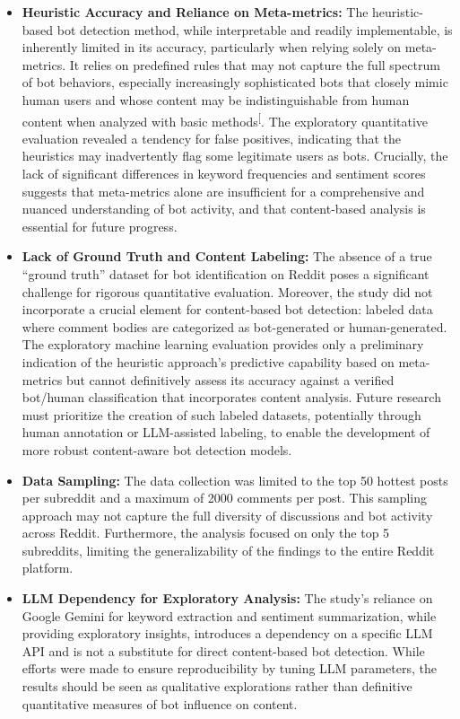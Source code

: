 \documentclass[
  12pt,
  letterpaper,
  DIV=11,
  numbers=noendperiod]{scrartcl}
\begin{document}
\begin{itemize}
\item
  \textbf{Heuristic Accuracy and Reliance on Meta-metrics:} The
  heuristic-based bot detection method, while interpretable and readily
  implementable, is inherently limited in its accuracy, particularly
  when relying solely on meta-metrics. It relies on predefined rules
  that may not capture the full spectrum of bot behaviors, especially
  increasingly sophisticated bots that closely mimic human users and
  whose content may be indistinguishable from human content when
  analyzed with basic
  methods\textsuperscript{{[}\citeproc{ref-botdetectionreddit}{1}{]}}.
  The exploratory quantitative evaluation revealed a tendency for false
  positives, indicating that the heuristics may inadvertently flag some
  legitimate users as bots. Crucially, the lack of significant
  differences in keyword frequencies and sentiment scores suggests that
  meta-metrics alone are insufficient for a comprehensive and nuanced
  understanding of bot activity, and that content-based analysis is
  essential for future progress.
\item
  \textbf{Lack of Ground Truth and Content Labeling:} The absence of a
  true ``ground truth'' dataset for bot identification on Reddit poses a
  significant challenge for rigorous quantitative evaluation. Moreover,
  the study did not incorporate a crucial element for content-based bot
  detection: labeled data where comment bodies are categorized as
  bot-generated or human-generated. The exploratory machine learning
  evaluation provides only a preliminary indication of the heuristic
  approach's predictive capability based on meta-metrics but cannot
  definitively assess its accuracy against a verified bot/human
  classification that incorporates content analysis. Future research
  must prioritize the creation of such labeled datasets, potentially
  through human annotation or LLM-assisted labeling, to enable the
  development of more robust content-aware bot detection models.
\item
  \textbf{Data Sampling:} The data collection was limited to the top 50
  hottest posts per subreddit and a maximum of 2000 comments per post.
  This sampling approach may not capture the full diversity of
  discussions and bot activity across Reddit. Furthermore, the analysis
  focused on only the top 5 subreddits, limiting the generalizability of
  the findings to the entire Reddit platform.
\item
  \textbf{LLM Dependency for Exploratory Analysis:} The study's reliance
  on Google Gemini for keyword extraction and sentiment summarization,
  while providing exploratory insights, introduces a dependency on a
  specific LLM API and is not a substitute for direct content-based bot
  detection. While efforts were made to ensure reproducibility by tuning
  LLM parameters, the results should be seen as qualitative explorations
  rather than definitive quantitative measures of bot influence on
  content.
\end{itemize}
\end{document}
